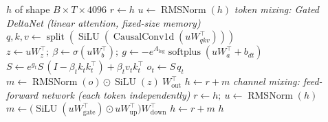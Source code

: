 \documentclass[10pt,a4paper]{article}
\newcommand{\op}[1]{\operatorname{#1}}
\theoremstyle{definition}
\begin{document}
\begin{algorithm}[H]
\caption{Block $\mathcal{B}_{\mathrm{L}}(h)$ --- Linear-attention (Gated DeltaNet) block}
\begin{algorithmic}[1]
\Require $h$ of shape $B\times T\times 4096$
\State $r \gets h$ 
\State $u \gets \op{RMSNorm}(h)$ 
\Statex \hspace{-1.2em}\textit{token mixing: Gated DeltaNet (linear attention, fixed-size memory)}
\State $q,k,v \gets \op{split}(\op{SiLU}(\op{CausalConv1d}(u W_{qkv}^{\top})))$ 
\State $z \gets u W_z^{\top};\ \beta \gets \sigma(u W_b^{\top});\ g \gets -e^{A_{\log}}\op{softplus}(u W_a^{\top}+b_{dt})$ 
 
\State $S \gets e^{g_t} S\,(I-\beta_t k_t k_t^{\top}) + \beta_t v_t k_t^{\top}$ 
\State $o_t \gets S\, q_t$ 
\EndFor
\State $m \gets \op{RMSNorm}(o)\odot \op{SiLU}(z)\ W_{\mathrm{out}}^{\top}$ 
\State $h \gets r + m$ 
\Statex \hspace{-1.2em}\textit{channel mixing: feed-forward network (each token independently)}
\State $r \gets h;\ u \gets \op{RMSNorm}(h)$
\State $m \gets \big(\op{SiLU}(u W_{\mathrm{gate}}^{\top}) \odot u W_{\mathrm{up}}^{\top}\big) W_{\mathrm{down}}^{\top}$ 
\State $h \gets r + m$ 
\State \Return $h$
\end{algorithmic}
\end{algorithm}
\end{document}
